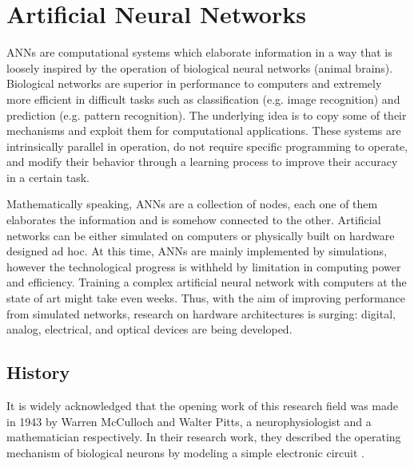 \chapter{Artificial Neural Networks}
\label{ch:Artificial_Neural_Networks}

\acfp{ANN} are computational systems which elaborate information in a way that is loosely inspired by the operation of biological neural networks (animal brains).
Biological networks are superior in performance to computers and extremely more efficient in difficult tasks such as classification (e.g. image recognition) and prediction (e.g. pattern recognition).
The underlying idea is to copy some of their mechanisms and exploit them for computational applications.
These systems are intrinsically parallel in operation, do not require specific programming to operate, and modify their behavior through a learning process to improve their accuracy in a certain task.

Mathematically speaking, \acsp{ANN} are a collection of nodes, each one of them elaborates the information and is somehow connected to the other.
Artificial networks can be either simulated on computers or physically built on hardware designed ad hoc.
At this time, \acsp{ANN} are mainly implemented by simulations, however the technological progress is withheld by limitation in computing power and efficiency.
Training a complex artificial neural network with computers at the state of art might take even weeks.
Thus, with the aim of improving performance from simulated networks, research on hardware architectures is surging: digital, analog, electrical, and optical devices are being developed.

\section{History}
\label{sec:History}
It is widely acknowledged that the opening work of this research field was made in 1943 by Warren McCulloch and Walter Pitts, a neurophysiologist and a mathematician respectively.
In their research work, they described the operating mechanism of biological neurons by modeling a simple electronic circuit \cite{McCulloch1943}.

